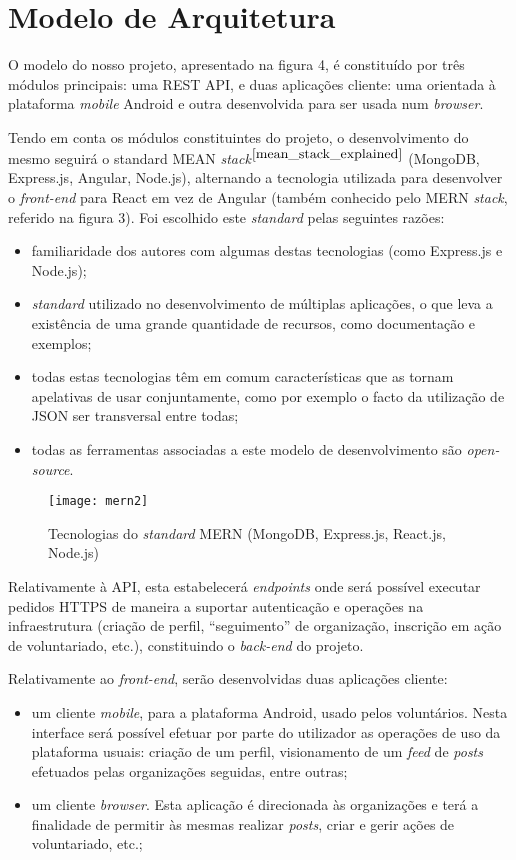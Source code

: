 \section{Modelo de Arquitetura} 
O modelo do nosso projeto, apresentado na figura 4, é constituído por três módulos principais: uma REST API, e duas aplicações cliente: uma orientada à plataforma \textit{mobile} Android e outra desenvolvida para ser usada num \textit{browser}. \par \medskip

Tendo em conta os módulos constituintes do projeto, o desenvolvimento do mesmo seguirá o standard MEAN \textit{stack}$^{\cite{mean_stack_explained}}$ (MongoDB, Express.js, Angular, Node.js), alternando a tecnologia utilizada para desenvolver o \textit{front-end} para React em vez de Angular (também conhecido pelo MERN \textit{stack}, referido na figura 3). Foi escolhido este \textit{standard} pelas seguintes razões:
\begin{itemize}
	\item familiaridade dos autores com algumas destas tecnologias (como Express.js e Node.js);
	\item \textit{standard} utilizado no desenvolvimento de múltiplas aplicações, o que leva a existência de uma grande quantidade de recursos, como documentação e exemplos;
	\item todas estas tecnologias têm em comum características que as tornam apelativas de usar conjuntamente, como por exemplo o facto da utilização de JSON ser transversal entre todas;
	\item todas as ferramentas associadas a este modelo de desenvolvimento são \textit{open-source}.
\end{itemize}

\begin{figure}[h]
	\centering
	\texttt{[image: mern2]}
	\caption{Tecnologias do \textit{standard} MERN (MongoDB, Express.js, React.js, Node.js)}
\end{figure}

Relativamente à API, esta estabelecerá \textit{endpoints} onde será possível executar pedidos HTTPS de maneira a suportar autenticação e operações na infraestrutura (criação de perfil, “seguimento” de organização, inscrição em ação de voluntariado, etc.), constituindo o \textit{back-end} do projeto.
\par \medskip

\newpage

Relativamente ao \textit{front-end}, serão desenvolvidas duas aplicações cliente: 
\begin{itemize}
	\item um cliente \textit{mobile}, para a plataforma Android, usado pelos voluntários. Nesta interface será possível efetuar por parte do utilizador as operações de uso da plataforma usuais: criação de um perfil, visionamento de um \textit{feed} de \textit{posts} efetuados pelas organizações seguidas, entre outras;
	\item um cliente \textit{browser}. Esta aplicação é direcionada às organizações e terá a finalidade de permitir às mesmas realizar \textit{posts}, criar e gerir ações de voluntariado, etc.;
\end{itemize}

